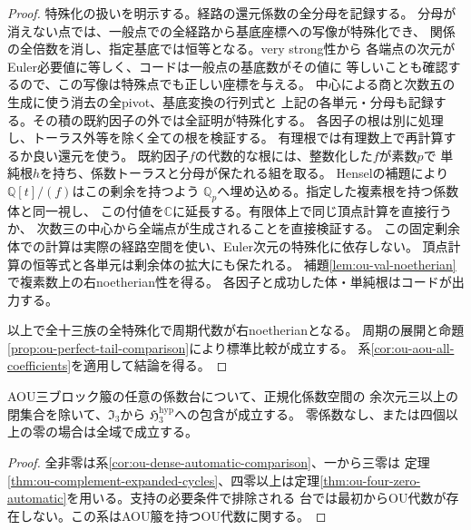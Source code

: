 \begin{proof}
特殊化の扱いを明示する。経路の還元係数の全分母を記録する。
分母が消えない点では、一般点での全経路から基底座標への写像が特殊化でき、
関係の全倍数を消し、指定基底では恒等となる。very strong性から
各端点の次元がEuler必要値に等しく、コードは一般点の基底数がその値に
等しいことも確認するので、この写像は特殊点でも正しい座標を与える。
中心による商と次数五の生成に使う消去の全pivot、基底変換の行列式と
上記の各単元・分母も記録する。その積の既約因子の外では全証明が特殊化する。
各因子の根は別に処理し、トーラス外等を除く全ての根を検証する。
有理根では有理数上で再計算するか良い還元を使う。
既約因子$f$の代数的な根には、整数化した$f$が素数$p$で
単純根$h$を持ち、係数トーラスと分母が保たれる組を取る。
Henselの補題により$\mathbb Q[t]/(f)$はこの剰余を持つよう
$\mathbb Q_p$へ埋め込める。指定した複素根を持つ係数体と同一視し、
この付値を$\mathbb C$に延長する。有限体上で同じ頂点計算を直接行うか、
次数三の中心から全端点が生成されることを直接検証する。
この固定剰余体での計算は実際の経路空間を使い、Euler次元の特殊化に依存しない。
頂点計算の恒等式と各単元は剰余体の拡大にも保たれる。
補題\ref{lem:ou-val-noetherian}で複素数上の右noetherian性を得る。
各因子と成功した体・単純根はコードが出力する。

以上で全十三族の全特殊化で周期代数が右noetherianとなる。
周期の展開と命題\ref{prop:ou-perfect-tail-comparison}により標準比較が成立する。
系\ref{cor:ou-aou-all-coefficients}を適用して結論を得る。
\end{proof}

\begin{corollary}[全AOU係数台における無条件の余次元境界]
\label{cor:ou-aou-codim-three}
AOU三ブロック箙の任意の係数台について、正規化係数空間の
余次元三以上の閉集合を除いて、$\mathfrak I_3$から
$\mathfrak H^{\mathrm{hyp}}_3$への包含が成立する。
零係数なし、または四個以上の零の場合は全域で成立する。
\end{corollary}
\begin{proof}
全非零は系\ref{cor:ou-dense-automatic-comparison}、一から三零は
定理\ref{thm:ou-complement-expanded-cycles}、四零以上は定理\ref{thm:ou-four-zero-automatic}を用いる。支持の必要条件で排除される
台では最初からOU代数が存在しない。この系はAOU箙を持つOU代数に関する。
\end{proof}

